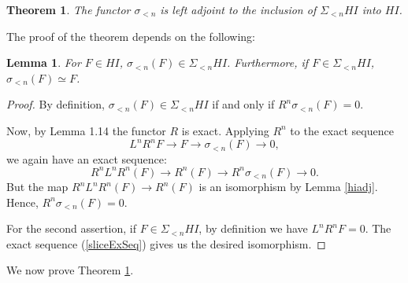 \documentclass[11pt]{amsart}
\numberwithin{equation}{section}
\theoremstyle{plain} %
\newtheorem{thm}[equation]{Theorem}
\newtheorem{lem}[equation]{Lemma}
\theoremstyle{definition}
\newcommand{\HI}{HI}
\newcommand{\sliceHI}{\sigma}
\newcommand{\SliceHI}{\Sigma}
\begin{document}
\begin{thm}\label{slicethm}
The functor $\sliceHI_{< n}$ is left adjoint to the inclusion 
of $\SliceHI_{< n} \HI$ into $\HI$.
\end{thm}

The proof of the theorem depends on the following:

\begin{lem}\label{hislice}
For $F \in \HI$, $\sliceHI_{< n}(F) \in \SliceHI_{< n}\HI$. 
Furthermore, if $F \in \SliceHI_{< n} \HI$, $\sliceHI_{<n}(F)
\simeq F$.
\end{lem}
\begin{proof}
By definition, $\sliceHI_{<n}(F) \in \SliceHI_{< n}\HI$ if
and only if $R^n \sliceHI_{<n}(F) = 0$.

Now, by \cite{Deg10} Lemma 1.14 the functor $R$ is exact. Applying 
$R^n$ to the exact sequence
\begin{equation}\label{sliceExSeq}
L^nR^n F \longrightarrow F \longrightarrow \sliceHI_{< n}(F)
\longrightarrow 0,
\end{equation}
we again have an exact sequence:
\[
R^nL^nR^n (F) \longrightarrow R^n(F) \longrightarrow 
R^n\sliceHI_{< n}(F) \longrightarrow 0.
\]
But the map $R^nL^nR^n(F) \rightarrow R^n(F)$ is an isomorphism 
by Lemma \ref{hiadj}. Hence, $R^n\sliceHI_{< n}(F) = 0$.

For the second assertion, if $F \in \SliceHI_{< n} \HI$,
by definition we have $L^nR^nF = 0$. The exact sequence 
(\ref{sliceExSeq}) gives us the desired isomorphism.
\end{proof}

We now prove Theorem \ref{slicethm}.
\end{document}
